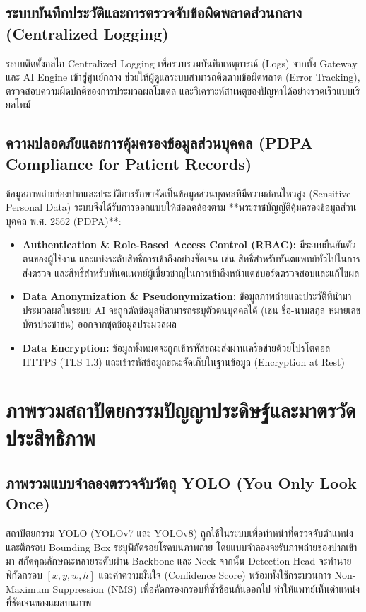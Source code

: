 \subsection{ระบบบันทึกประวัติและการตรวจจับข้อผิดพลาดส่วนกลาง (Centralized Logging)}
ระบบติดตั้งกลไก Centralized Logging เพื่อรวบรวมบันทึกเหตุการณ์ (Logs) จากทั้ง Gateway และ AI Engine เข้าสู่ศูนย์กลาง ช่วยให้ผู้ดูแลระบบสามารถติดตามข้อผิดพลาด (Error Tracking), ตรวจสอบความผิดปกติของการประมวลผลโมเดล และวิเคราะห์สาเหตุของปัญหาได้อย่างรวดเร็วแบบเรียลไทม์

\subsection{ความปลอดภัยและการคุ้มครองข้อมูลส่วนบุคคล (PDPA Compliance for Patient Records)}
ข้อมูลภาพถ่ายช่องปากและประวัติการรักษาจัดเป็นข้อมูลส่วนบุคคลที่มีความอ่อนไหวสูง (Sensitive Personal Data) ระบบจึงได้รับการออกแบบให้สอดคล้องตาม **พระราชบัญญัติคุ้มครองข้อมูลส่วนบุคคล พ.ศ. 2562 (PDPA)**:
\begin{itemize}
    \item \textbf{Authentication \& Role-Based Access Control (RBAC):} มีระบบยืนยันตัวตนของผู้ใช้งาน และแบ่งระดับสิทธิ์การเข้าถึงอย่างชัดเจน เช่น สิทธิ์สำหรับทันตแพทย์ทั่วไปในการส่งตรวจ และสิทธิ์สำหรับทันตแพทย์ผู้เชี่ยวชาญในการเข้าถึงหน้าแดชบอร์ดตรวจสอบและแก้ไขผล
    \item \textbf{Data Anonymization \& Pseudonymization:} ข้อมูลภาพถ่ายและประวัติที่นำมาประมวลผลในระบบ AI จะถูกตัดข้อมูลที่สามารถระบุตัวตนบุคคลได้ (เช่น ชื่อ-นามสกุล หมายเลขบัตรประชาชน) ออกจากชุดข้อมูลประมวลผล
    \item \textbf{Data Encryption:} ข้อมูลทั้งหมดจะถูกเข้ารหัสขณะส่งผ่านเครือข่ายด้วยโปรโตคอล HTTPS (TLS 1.3) และเข้ารหัสข้อมูลขณะจัดเก็บในฐานข้อมูล (Encryption at Rest)
\end{itemize}

\section{ภาพรวมสถาปัตยกรรมปัญญาประดิษฐ์และมาตรวัดประสิทธิภาพ}
\label{sec:ai_architecture_overview}

\subsection{ภาพรวมแบบจำลองตรวจจับวัตถุ YOLO (You Only Look Once)}
สถาปัตยกรรม YOLO (YOLOv7 และ YOLOv8) ถูกใช้ในระบบเพื่อทำหน้าที่ตรวจจับตำแหน่งและตีกรอบ Bounding Box ระบุพิกัดรอยโรคบนภาพถ่าย โดยแบบจำลองจะรับภาพถ่ายช่องปากเข้ามา สกัดคุณลักษณะหลายระดับผ่าน Backbone และ Neck จากนั้น Detection Head จะทำนายพิกัดกรอบ $[x, y, w, h]$ และค่าความมั่นใจ (Confidence Score) พร้อมทั้งใช้กระบวนการ Non-Maximum Suppression (NMS) เพื่อคัดกรองกรอบที่ซ้ำซ้อนกันออกไป ทำให้แพทย์เห็นตำแหน่งที่ชัดเจนของแผลบนภาพ

